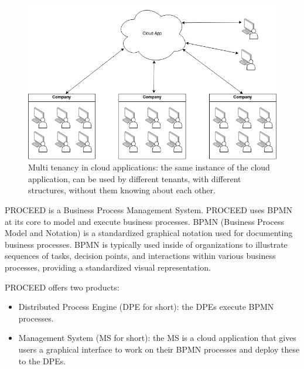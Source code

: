\begin{figure}[H]
	\centering
	\includegraphics[scale=0.45]{images/mt-cloud-services.png}
	\caption{Multi tenancy in cloud applications: the same instance of the cloud
		application, can be used by different tenants, with different structures, without them knowing about each other.}
	\vspace{-1em} %
	\label{fig:multi-tenant=cloud-applications}
\end{figure}

PROCEED%
is a Business Process Management System.
PROCEED uses BPMN at its core to model and execute business processes.
BPMN (Business Process Model and Notation) is a standardized graphical notation used for documenting business processes.
BPMN is typically used inside of organizations to illustrate sequences of tasks,
decision points, and interactions within various business processes, providing a standardized visual representation.

PROCEED offers two products:
\begin{itemize}
	\item Distributed Process Engine (DPE for short): the DPEs execute BPMN processes.
	\item Management System (MS for short): the MS is a cloud application that gives users
	      a graphical interface to work on their BPMN processes and deploy these to the DPEs.
\end{itemize}

